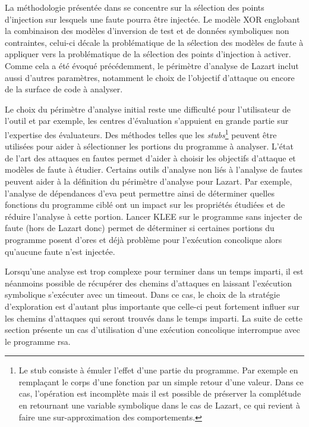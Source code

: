             La méthodologie présentée dans \cite{lacombe2023combining} se concentre sur la sélection des points d'injection sur lesquels une faute pourra être injectée.
            Le modèle XOR englobant la combinaison des modèles d'inversion de test et de données symboliques non contraintes, celui-ci décale la problématique de la sélection des modèles de faute à appliquer vers la problématique de la sélection des points d'injection à activer.
            Comme cela a été évoqué précédemment, le périmètre d'analyse de Lazart inclut aussi d'autres paramètres, notamment le choix de l'objectif d'attaque ou encore de la surface de code à analyser.
            
            Le choix du périmètre d'analyse initial reste une difficulté pour l'utilisateur de l'outil et par exemple, les centres d'évaluation s'appuient en grande partie sur l'expertise des évaluateurs.
            Des méthodes telles que les \textit{stubs}\footnote{Le stub consiste à émuler l'effet d'une partie du programme. Par exemple en remplaçant le corps d'une fonction par un simple retour d'une valeur. Dans ce cas, l'opération est incomplète mais il est possible de préserver la complétude en retournant une variable symbolique dans le cas de Lazart, ce qui revient à faire une sur-approximation des comportements.} peuvent être utilisées pour aider à sélectionner les portions du programme à analyser. L'état de l'art des attaques en fautes permet d'aider à choisir les objectifs d'attaque et modèles de faute à étudier.
            Certains outils d'analyse non liés à l'analyse de fautes peuvent aider à la définition du périmètre d'analyse pour Lazart. Par exemple, l'analyse de dépendances d'\gls{eva} peut permettre ainsi de déterminer quelles fonctions du programme ciblé ont un impact sur les propriétés étudiées et de réduire l'analyse à cette portion.
            Lancer KLEE sur le programme sans injecter de faute (hors de Lazart donc) permet de déterminer si certaines portions du programme posent d'ores et déjà problème pour l'exécution concolique alors qu'aucune faute n'est injectée.
            
            Lorsqu'une analyse est trop complexe pour terminer dans un temps imparti, il est néanmoins possible de récupérer des chemins d'attaques en laissant l'exécution symbolique s'exécuter avec un timeout.
            Dans ce cas, le choix de la stratégie d'exploration est d'autant plus importante que celle-ci peut fortement influer sur les chemins d'attaques qui seront trouvés dans le temps imparti.
            La suite de cette section présente un cas d'utilisation d'une exécution concolique interrompue avec le programme \gls{rsa}.  
           
